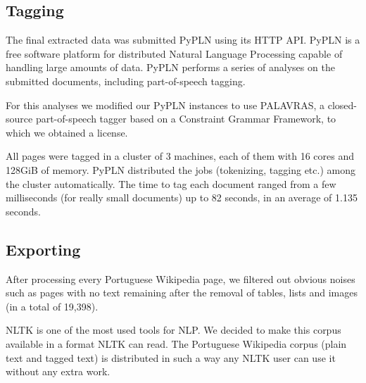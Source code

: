 \documentclass[11pt,a4paper]{article}
\begin{document}
\subsection{Tagging}

The final extracted data was submitted PyPLN\citep{pypln} using its HTTP API.
PyPLN is a free software platform for distributed Natural Language Processing
capable of handling large amounts of data. PyPLN performs a series of analyses
on the submitted documents, including part-of-speech tagging.


For this analyses we modified our PyPLN instances to use
PALAVRAS\citep{palavras}, a closed-source part-of-speech tagger based on a
Constraint Grammar Framework, to which we obtained a license.


All pages were tagged in a cluster of 3 machines, each of them with 16 cores
and 128GiB of memory. PyPLN distributed the jobs (tokenizing, tagging etc.)
among the cluster automatically.  The time to tag each document ranged from a
few milliseconds (for really small documents) up to 82 seconds, in an average
of 1.135 seconds.



\subsection{Exporting}

After processing every Portuguese Wikipedia page, we filtered out obvious
noises such as pages with no text remaining after the removal of tables, lists
and images (in a total of 19,398).

NLTK is one of the most used tools for NLP. We decided to make this corpus
available in a format NLTK can read. The Portuguese Wikipedia corpus (plain
text and tagged text) is distributed in such a way any NLTK user can use it
without any extra work.

\end{document}
